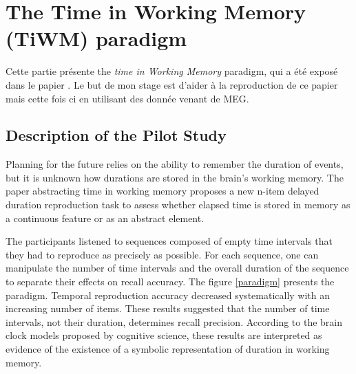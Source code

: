 \section{The Time in Working Memory (TiWM) paradigm}

Cette partie présente the \textit{time in Working Memory} paradigm, qui a été exposé dans le papier \cite{herbst2021abstracting}. Le but de mon stage est d'aider à la reproduction de ce papier mais cette fois ci en utilisant des donnée venant de MEG.

\subsection{Description of the Pilot Study}

Planning for the future relies on the ability to remember the duration of events, but it is unknown how durations are stored in the brain's working memory.  The paper abstracting time in working memory proposes a new n-item delayed duration reproduction task to assess whether elapsed time is stored in memory as a continuous feature or as an abstract element. 


The participants listened to sequences composed of empty time intervals that they had to reproduce as precisely as possible. For each sequence, one can manipulate the number of time intervals and the overall duration of the sequence to separate their effects on recall accuracy. The figure \ref{paradigm} presents the paradigm. Temporal reproduction accuracy decreased systematically with an increasing number of items. These results suggested that the number of time intervals, not their duration, determines recall precision. According to the brain clock models proposed by cognitive science, these results are interpreted as evidence of the existence of a symbolic representation of duration in working memory.



